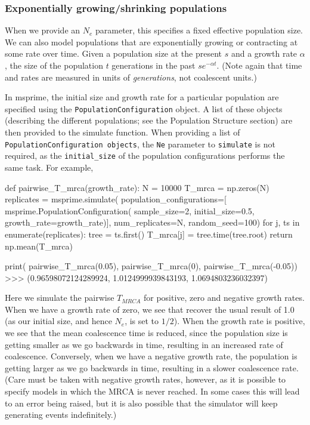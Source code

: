 \documentclass[graybox]{svmult}
\begin{document}
\subsubsection{Exponentially growing/shrinking
populations}\label{exponentially-growingshrinking-populations}

When we provide an \(N_e\) parameter, this specifies a fixed effective
population size. We can also model populations that are exponentially
growing or contracting at some rate over time. Given a population size
at the present \(s\) and a growth rate \(\alpha\), the size of the
population \(t\) generations in the past \(s e^{-\alpha t}\). (Note
again that time and rates are measured in units of \emph{generations},
not coalescent units.)

In msprime, the initial size and growth rate for a particular population
are specified using the \texttt{PopulationConfiguration} object. A list
of these objects (describing the different populations; see the
Population Structure section) are then provided to the simulate
function. When providing a list of
\texttt{PopulationConfiguration\ objects}, the \texttt{Ne} parameter to
\texttt{simulate} is not required, as the \texttt{initial\_size} of the
population configurations performs the same task. For example,

\begin{pythoncode}
def pairwise_T_mrca(growth_rate):
    N = 10000
    T_mrca = np.zeros(N)
    replicates = msprime.simulate(
        population_configurations=[
             msprime.PopulationConfiguration(
                sample_size=2, initial_size=0.5,
                growth_rate=growth_rate)],
        num_replicates=N, random_seed=100)
    for j, ts in enumerate(replicates):
        tree = ts.first()
        T_mrca[j] = tree.time(tree.root)
    return np.mean(T_mrca)

print(
    pairwise_T_mrca(0.05), pairwise_T_mrca(0),
    pairwise_T_mrca(-0.05))
>>> (0.96598072124289924, 1.0124999939843193, 1.0694803236032397)
\end{pythoncode}

    Here we simulate the pairwise \(T_{MRCA}\) for positive, zero and
negative growth rates. When we have a growth rate of zero, we see that
recover the usual result of 1.0 (as our initial size, and hence \(N_e\),
is set to \(1/2\)). When the growth rate is positive, we see that the
mean coalescence time is reduced, since the population size is getting
smaller as we go backwards in time, resulting in an increased rate of
coalescence. Conversely, when we have a negative growth rate, the
population is getting larger as we go backwards in time, resulting in a
slower coalescence rate. (Care must be taken with negative growth rates,
however, as it is possible to specify models in which the MRCA is never
reached. In some cases this will lead to an error being raised, but it
is also possible that the simulator will keep generating events
indefinitely.)
\end{document}
